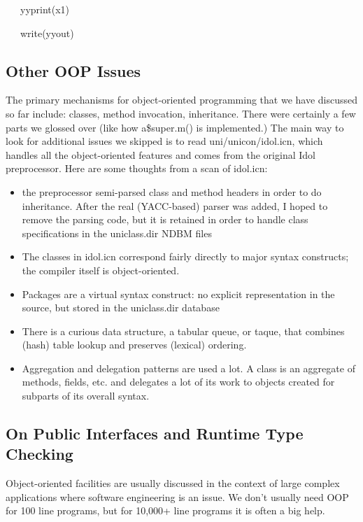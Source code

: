 {\ttfamily\mdseries
\ \ \ yyprint(x1)}

{\ttfamily\mdseries
\ \ \ write(yyout)}

\subsection{Other OOP Issues}

The primary mechanisms for object-oriented programming that we have
discussed so far include: classes, method invocation,
inheritance. There were certainly a few parts we glossed over (like
how a\$super.m() is implemented.) The main way to look for additional
issues we skipped is to read uni/unicon/idol.icn, which handles all
the object-oriented features and comes from the original Idol
preprocessor. Here are some thoughts from a scan of idol.icn:

\liststyleLxliv
\begin{itemize}
\item 
the preprocessor semi-parsed class and method headers in order to do inheritance. After the real (YACC-based) parser was
added, I hoped to remove the parsing code, but it is retained in order to handle class specifications in the
uniclass.dir NDBM files 
\item 
The classes in idol.icn correspond fairly directly to major syntax constructs; the compiler itself is object-oriented. 
\item 
Packages are a {\textquotedbl}virtual syntax construct{\textquotedbl}: no explicit representation in the source, but
stored in the uniclass.dir database 
\item 
There is a curious data structure, a tabular queue, or taque, that combines (hash) table lookup and preserves (lexical)
ordering. 
\item 
Aggregation and delegation patterns are used a lot. A class is an aggregate of methods, fields, etc. and delegates a lot
of its work to objects created for subparts of its overall syntax. 
\end{itemize}

\subsection{On Public Interfaces and Runtime Type Checking}

Object-oriented facilities are usually discussed in the context of
large complex applications where software engineering is an issue. We
don't usually need OOP for 100 line programs, but for 10,000+ line
programs it is often a big help.

